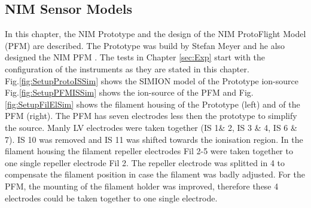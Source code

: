 	\subsection{NIM Sensor Models}\label{subsec:setupInst}
	In this chapter, the NIM Prototype and the design of the NIM ProtoFlight Model (PFM) are described. The Prototype was build by Stefan Meyer and he also designed the NIM PFM \cite{Diss_Meyer}. The tests in Chapter \ref{sec:Exp} start with the configuration of the instruments as they are stated in this chapter.\\
	Fig.\ref{fig:SetupProtoISSim} shows the SIMION model of the Prototype ion-source Fig.\ref{fig:SetupPFMISSim} shows the ion-source of the PFM and Fig.\ref{fig:SetupFilElSim} shows the filament housing of the Prototype (left) and of the PFM (right). The PFM has seven electrodes less then the prototype to simplify the source. Manly LV electrodes were taken together (IS 1\& 2, IS 3 \& 4, IS 6 \& 7). IS 10 was removed and IS 11 was shifted towards the ionisation region. In the filament housing the filament repeller electrodes Fil 2-5 were taken together to one single repeller electrode Fil 2. The repeller electrode was splitted in 4 to compensate the filament position in case the filament was badly adjusted. For the PFM, the mounting of the filament holder was improved, therefore these 4 electrodes could be taken together to one single electrode.\\

	

